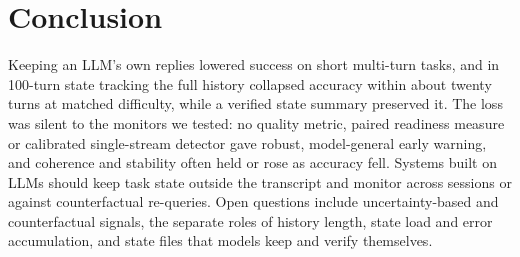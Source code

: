 \section{Conclusion}
\label{sec:conclusion}

Keeping an LLM's own replies lowered success on short multi-turn tasks, and in
100-turn state tracking the full history collapsed accuracy within about twenty
turns at matched difficulty, while a verified state summary preserved it. The
loss was silent to the monitors we tested: no quality metric, paired readiness
measure or calibrated single-stream detector gave robust, model-general early
warning, and coherence and stability often held or rose as accuracy fell.
Systems built on LLMs should keep task state outside the transcript and monitor
across sessions or against counterfactual re-queries. Open questions include
uncertainty-based and counterfactual signals, the separate roles of history
length, state load and error accumulation, and state files that models keep
and verify themselves.
